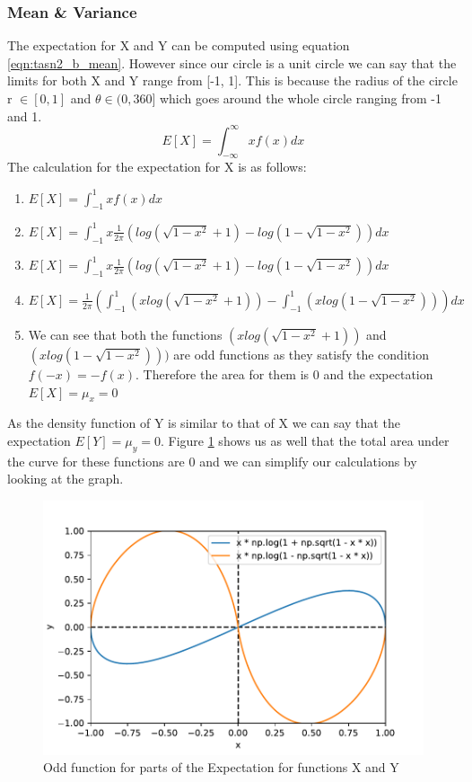 \subsubsection{ Mean \& Variance }
The expectation for X and Y can be computed using equation \ref{eqn:tasn2_b_mean}. However since our circle is a unit circle we can say that the limits for both X and Y range from [-1, 1]. This is because the radius of the circle r $\in [0, 1]$ and $\theta \in (0, 360]$ which goes around the whole circle ranging from -1 and 1.
\begin{equation} \label{eqn:tasn2_b_mean}
    E[X] = \int_{-\infty}^{\infty}xf(x) dx
\end{equation}
The calculation for the expectation for X is as follows:
\begin{enumerate}
    \item $E[X] = \int_{-1}^{1}xf(x) dx$
    \item $E[X] = \int_{-1}^{1}x\frac{1}{2\pi} (log(\sqrt{1-x^2}+1)- log(1-\sqrt{1-x^2})) dx$
    \item $E[X] = \int_{-1}^{1}x\frac{1}{2\pi} (log(\sqrt{1-x^2}+1)- log(1-\sqrt{1-x^2})) dx$
    \item $E[X] = \frac{1}{2\pi} (\int_{-1}^{1}(x log(\sqrt{1-x^2}+1))- \int_{-1}^{1}(x log(1-\sqrt{1-x^2}))) dx$
    \item We can see that both the functions $(x log(\sqrt{1-x^2}+1))$ and $(x log(1-\sqrt{1-x^2})))$ are odd functions as they satisfy the condition $f(-x) = -f(x)$. Therefore the area for them is 0 and the expectation $E[X]=\mu_x = 0$
\end{enumerate}
As the density function of Y is similar to that of X we can say that the expectation $E[Y]=\mu_y = 0$. Figure \ref{fig:task_2_b_odd_function} shows us as well that the total area under the curve for these functions are 0 and we can simplify our calculations by looking at the graph.

\begin{figure}[h!]
\centering
\includegraphics[width=\textwidth]{pics/task_2_b_odd_func.pdf}
\caption{Odd function for parts of the Expectation for functions X and Y}\label{fig:task_2_b_odd_function}
\end{figure}
\FloatBarrier

